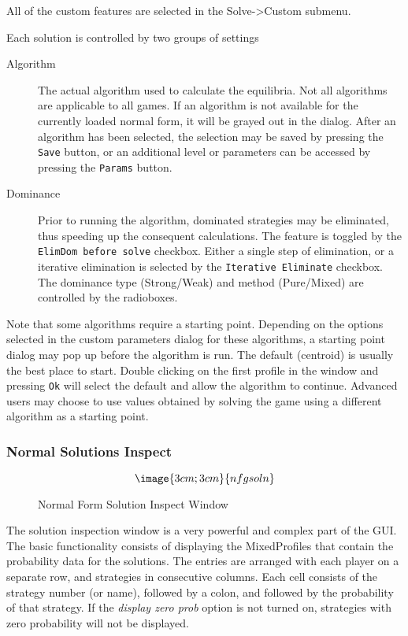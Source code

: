 All of the custom features are selected in the Solve->Custom submenu.  

Each solution is controlled by two groups of settings
\begin{description}
\item[Algorithm] The actual algorithm used to calculate the equilibria.  Not all algorithms
are applicable to all games.  If an algorithm is not available for the
currently loaded normal form, it will be grayed out in the dialog.  After an
algorithm has been selected, the selection may be saved by pressing 
the {\tt Save} button, or an additional level or parameters can be accessed by
pressing the {\tt Params} button.
\item[Dominance] Prior to running the algorithm, dominated strategies may be eliminated, thus
speeding up the consequent calculations.  The feature is toggled by 
the {\tt ElimDom before solve} checkbox.  Either a single step of elimination,
or a iterative elimination is selected by the {\tt Iterative Eliminate} 
checkbox.  The dominance type (Strong/Weak) and method (Pure/Mixed) are
 controlled by the radioboxes.
\end{description}

Note that some algorithms require a starting point.  Depending on the
options selected in the custom parameters dialog for these algorithms,
a starting point dialog may pop up before the algorithm is run.  The
default (centroid) is usually the best place to start.  Double clicking on
the first profile in the window and pressing {\tt Ok} will select the
default and allow the algorithm to continue. Advanced users may choose to
use values obtained by solving the game using a different algorithm as a
starting point.

\subsubsection{Normal Solutions Inspect}\label{NormalSolutionInspect}
\begin{figure}
$$\image{3cm;3cm}{nfgsoln}$$
\caption{Normal Form Solution Inspect Window}\label{fig_nfgsoln}
\end{figure}


The solution inspection window is a very powerful and complex part of the GUI.
The basic functionality consists of displaying the MixedProfiles that contain the
probability data for the solutions.  The entries are arranged with each 
player on a separate row, and strategies in consecutive columns.  
Each cell consists of the strategy number (or name), followed by a colon, and followed
by the probability of that strategy.
If the {\em display zero prob} option is not turned on, strategies with zero probability
will not be displayed. 

